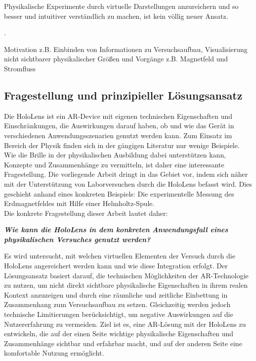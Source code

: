 Physikalische Experimente durch virtuelle Darstellungen anzureichern und so besser und intuitiver verständlich zu machen, ist kein völlig neuer Ansatz. 

\cite{Amiraslanov18}.  \cite{Javaheri18}

Motivation z.B. Einbinden von Informationen zu Versuchsaufbau, Visualisierung nicht sichtbarer physikalischer Größen und Vorgänge z.B. Magnetfeld und Stromfluss



\subsection{Fragestellung und prinzipieller Lösungsansatz}
\label{sec-1-2}
Die HoloLens ist ein AR-Device mit eigenen technischen Eigenschaften und Einschränkungen, die Auswirkungen darauf haben, ob und wie das Gerät in verschiedenen Anwendungsszenarien genutzt werden kann. Zum Einsatz im Bereich der Physik finden sich in der gängigen Literatur nur wenige Beispiele. Wie die Brille in der physikalischen Ausbildung dabei unterstützen kann, Konzepte und Zusammenhänge zu vermitteln, ist daher eine interessante Fragestellung. Die vorliegende Arbeit dringt in das Gebiet vor, indem sich näher mit der Unterstützung von Laborversuchen durch die HoloLens befasst wird. Dies geschieht anhand eines konkreten Beispiels: Die experimentelle Messung des Erdmagnetfeldes mit Hilfe einer Helmholtz-Spule.\\

Die konkrete Fragestellung dieser Arbeit lautet daher:
\begin{center}
	\textit{\textbf{Wie kann die HoloLens in dem konkreten Anwendungsfall eines physikalischen Versuches genutzt werden?}}
\end{center}

Es wird untersucht, mit welchen virtuellen Elementen der Versuch durch die HoloLens angereichert werden kann und wie diese Integration erfolgt. Der Lösungsansatz basiert darauf, die technischen Möglichkeiten der AR-Technologie zu nutzen, um nicht direkt sichtbare physikalische Eigenschaften in ihrem realen Kontext anzuzeigen und durch eine räumliche und zeitliche Einbettung in Zusammenhang zum Versuchsaufbau zu setzen. Gleichzeitig werden jedoch technische Limitierungen berücksichtigt, um negative Auswirkungen auf die Nutzererfahrung zu vermeiden. Ziel ist es, eine AR-Lösung mit der HoloLens zu entwickeln, die auf der einen Seite wichtige physikalische Eigenschaften und Zusammenhänge sichtbar und erfahrbar macht, und auf der anderen Seite eine komfortable Nutzung ermöglicht.

